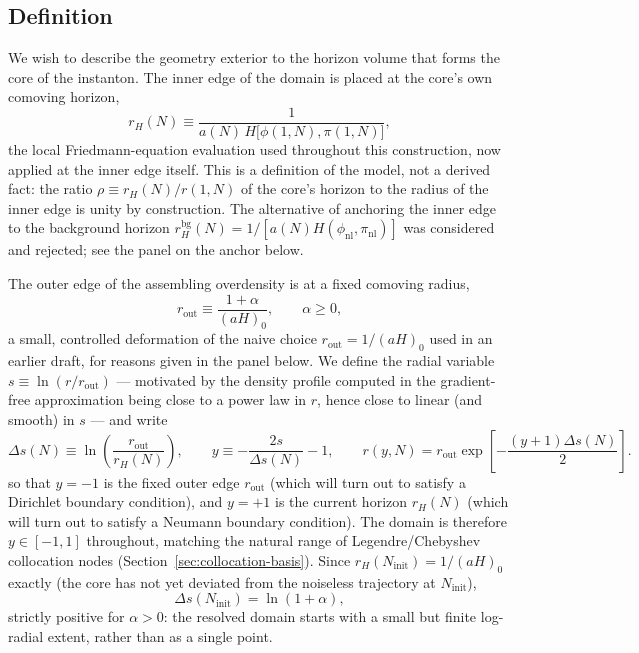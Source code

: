 \documentclass[a4paper,11pt]{article}
\renewcommand{\geq}{\geqslant}
\newcommand{\Ny}{N}                          %
\newcommand{\Ninit}{N_{\mathrm{init}}}       %
\newcommand{\Hub}{H}                         %
\newcommand{\sfactor}{a}                     %
\newcommand{\field}{\phi}                    %
\newcommand{\mom}{\pi}                       %
\newcommand{\phinl}{\field_{\mathrm{nl}}}    %
\newcommand{\pinl}{\mom_{\mathrm{nl}}}       %
\newcommand{\rad}{r}                         %
\newcommand{\yco}{y}                         %
\newcommand{\rout}{\rad_{\mathrm{out}}}      %
\newcommand{\aHo}{(\sfactor \Hub)_0}         %
\newcommand{\rH}{\rad_H}                     %
\newcommand{\Deltas}{\Delta s}                %
\newcommand{\rHbg}{\rad_H^{\mathrm{bg}}}      %
\begin{document}
\subsection{Definition}

We wish to describe the geometry exterior to the horizon volume that
forms the core of the instanton. The inner edge of the domain is placed at
the core's own comoving horizon,
\begin{equation}
    \rH(\Ny) \equiv \frac{1}{a(\Ny)\,\Hub\big[\field(1,\Ny),\mom(1,\Ny)\big]} ,
    \label{eq:rH-definition}
\end{equation}
the local Friedmann-equation evaluation used throughout this construction,
now applied at the inner edge itself. This is a definition of the model,
not a derived fact: the ratio $\rho \equiv \rH(\Ny)/\rad(1,\Ny)$ of the
core's horizon to the radius of the inner edge is unity by construction.
The alternative of anchoring the inner edge to the background horizon
$\rHbg(\Ny) = 1/[a(\Ny)\Hub(\phinl,\pinl)]$ was considered and rejected;
see the panel on the anchor below.

The outer edge of the assembling overdensity is at a fixed comoving radius,
\begin{equation}
    \rout \equiv \frac{1+\alpha}{\aHo} ,
    \qquad \alpha \geq 0 ,
    \label{eq:rout-alpha}
\end{equation}
a small, controlled deformation of the naive choice $\rout=1/\aHo$ used in
an earlier draft, for reasons given in the panel below. We define the
radial variable $s \equiv \ln(\rad/\rout)$ --- motivated by the density
profile computed in the gradient-free approximation being close to a
power law in $\rad$, hence close to linear (and smooth) in $s$ --- and
write
\begin{equation}
    \Deltas(\Ny) \equiv \ln\!\left(\frac{\rout}{\rH(\Ny)}\right) ,
    \qquad
    \yco \equiv -\frac{2s}{\Deltas(\Ny)} - 1 ,
    \qquad
    \rad(\yco,\Ny) = \rout \exp\!\left[-\frac{(\yco+1)\Deltas(\Ny)}{2}\right] .
    \label{eq:y-definition}
\end{equation}
so that $\yco=-1$ is the fixed outer edge $\rout$ (which will turn out to
satisfy a Dirichlet boundary condition), and $\yco=+1$ is the current
horizon $\rH(\Ny)$ (which will turn out to satisfy a Neumann boundary
condition). The domain is therefore $\yco\in[-1,1]$ throughout, matching
the natural range of Legendre/Chebyshev collocation nodes
(Section~\ref{sec:collocation-basis}). Since $\rH(\Ninit)=1/\aHo$ exactly
(the core has not yet deviated from the noiseless trajectory at $\Ninit$),
\begin{equation}
    \Deltas(\Ninit) = \ln(1+\alpha) ,
    \label{eq:Deltas-init}
\end{equation}
strictly positive for $\alpha>0$: the resolved domain starts with a small
but finite log-radial extent, rather than as a single point.
\end{document}
